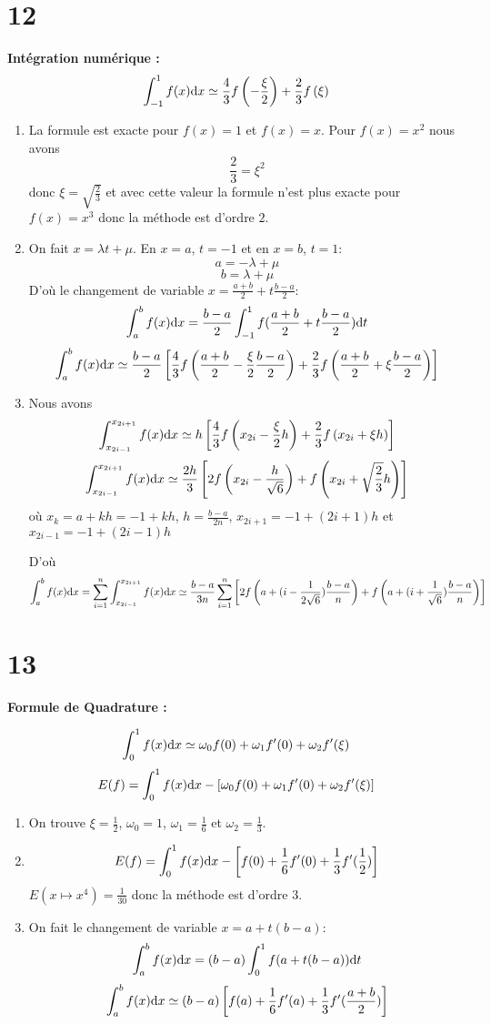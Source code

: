 \documentclass[a4paper]{article}
\def \de {{\rm d}}
\begin{document}
\section*{12}{\bf Intégration numérique : }
\[\int_{-1}^1f(x)\de x\simeq\frac 43f\left(-\frac{\xi}{2}\right)+\frac 23f\left(\xi\right)\]
\begin{enumerate}
\item La formule est exacte pour $f(x)=1$ et $f(x)=x$. Pour $f(x)=x^2$ nous avons
\[\frac 23=\xi^2\]
donc $\xi=\sqrt{\frac{2}{3}}$ et avec cette valeur la formule n'est plus exacte pour $f(x)=x^3$ donc la méthode est d'ordre $2$.
\item On fait $x=\lambda t+\mu$. En $x=a$, $t=-1$ et en $x=b$, $t=1$:
\[a=-\lambda+\mu\]
\[b=\lambda +\mu\]
D'où le changement de variable $x=\frac{a+b}{2}+t\frac{b-a}{2}$:
\[\int_{a}^bf(x)\de x=\frac{b-a}{2}\int_{-1}^1f(\frac{a+b}{2}+t\frac{b-a}{2})\de t\]
\[\int_{a}^bf(x)\de x\simeq\frac{b-a}{2}\left[\frac 43f\left(\frac{a+b}{2}-\frac{\xi}{2}\frac{b-a}{2}\right)+\frac 23f\left(\frac{a+b}{2}+\xi\frac{b-a}{2}\right)\right]\]
\item Nous avons
\[\int_{x_{2i-1}}^{x_{2i+1}}f(x)\de x\simeq h\left[\frac 43f\left(x_{2i}-\frac{\xi}{2}h\right)+\frac 23f\left(x_{2i}+\xi h\right)\right]\]
\[\int_{x_{2i-1}}^{x_{2i+1}}f(x)\de x\simeq\frac{2h}{3}\left[2f\left(x_{2i}-\frac{h}{\sqrt 6}\right)+f\left(x_{2i}+\sqrt{\frac 23} h \right)\right]\]
où $x_k=a+kh=-1+kh$, $h=\frac{b-a}{2n}$, 
$x_{2i+1}=-1+(2i+1)h$ et $x_{2i-1}=-1+(2i-1)h$


D'où
\[\int_{a}^bf(x)\de x=\sum_{i=1}^{n}\int_{x_{2i-1}}^{x_{2i+1}}f(x)\de x\simeq\frac{b-a}{3n}\sum_{i=1}^{n}\left[2f\left(a+(i-\frac 1{2\sqrt 6})\frac{b-a}{n}\right)+f\left(a+(i+\frac 1{\sqrt{6}})\frac{b-a}{n}\right)\right]\]
\end{enumerate}

\section*{13}{\bf Formule de Quadrature : }

\[\int_0^1 f(x) \de x \simeq \omega_0 f(0) +  \omega_1f'(0) +  \omega_2f'(\xi)\]
\[E(f) =\int_0^1 f(x) \de x -\left[ \omega_0 f(0) +  \omega_1f'(0) +  \omega_2f'(\xi)\right]\]
\begin{enumerate}
\item On trouve $\xi=\frac 12$, $\omega_0=1$, $\omega_1=\frac 16$ et $\omega_2=\frac 13$.
\item  
\[E(f) =\int_0^1 f(x) \de x -\left[  f(0) +  \frac 16 f'(0) +  \frac 13f'(\frac 12)\right]\]
 $E(x \mapsto x^4)=\frac 1{30}$ donc la méthode est d'ordre 3. 

\item  On fait le changement de variable $x=a+t(b-a)$:
\[\int_{a}^bf(x)\de x=(b-a)\int_{0}^1f(a+t(b-a))\de t\]
\[\int_{a}^bf(x)\de x\simeq(b-a)\left[f(a) +  \frac 16 f'(a) +  \frac 13f'(\frac {a+b}2)\right]\]
\end{enumerate}
\end{document}
